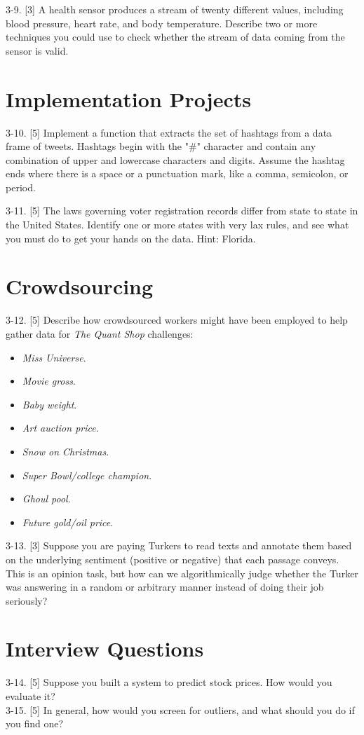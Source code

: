 \documentclass[10pt]{article}
\begin{document}
3-9. [3] A health sensor produces a stream of twenty different values, including blood pressure, heart rate, and body temperature. Describe two or more techniques you could use to check whether the stream of data coming from the sensor is valid.

\section*{Implementation Projects}
3-10. [5] Implement a function that extracts the set of hashtags from a data frame of tweets. Hashtags begin with the "\#" character and contain any combination of upper and lowercase characters and digits. Assume the hashtag ends where there is a space or a punctuation mark, like a comma, semicolon, or period.

3-11. [5] The laws governing voter registration records differ from state to state in the United States. Identify one or more states with very lax rules, and see what you must do to get your hands on the data. Hint: Florida.

\section*{Crowdsourcing}
3-12. [5] Describe how crowdsourced workers might have been employed to help gather data for \textit{The Quant Shop} challenges:
\begin{itemize}
  \item \textit{Miss Universe}.
  \item \textit{Movie gross}.
  \item \textit{Baby weight}.
  \item \textit{Art auction price}.
  \item \textit{Snow on Christmas}.
  \item \textit{Super Bowl/college champion}.
  \item \textit{Ghoul pool}.
  \item \textit{Future gold/oil price}.
\end{itemize}

3-13. [3] Suppose you are paying Turkers to read texts and annotate them based on the underlying sentiment (positive or negative) that each passage conveys. This is an opinion task, but how can we algorithmically judge whether the Turker was answering in a random or arbitrary manner instead of doing their job seriously?

\section*{Interview Questions}
3-14. [5] Suppose you built a system to predict stock prices. How would you evaluate it?\\
3-15. [5] In general, how would you screen for outliers, and what should you do if you find one?
\end{document}
